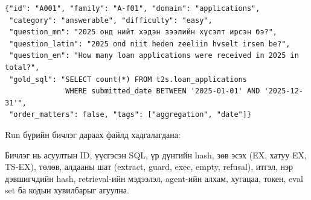 \begin{lstlisting}[basicstyle=\ttfamily\scriptsize, caption={Бичлэгийн жишээ (dev, A001; уншихад хялбар болгож мөр таслав, зарим талбарыг орхив)}, breaklines=true, showstringspaces=false, language={}]
{"id": "A001", "family": "A-f01", "domain": "applications",
 "category": "answerable", "difficulty": "easy",
 "question_mn": "2025 онд нийт хэдэн зээлийн хүсэлт ирсэн бэ?",
 "question_latin": "2025 ond niit heden zeeliin hvselt irsen be?",
 "question_en": "How many loan applications were received in 2025 in total?",
 "gold_sql": "SELECT count(*) FROM t2s.loan_applications
              WHERE submitted_date BETWEEN '2025-01-01' AND '2025-12-31'",
 "order_matters": false, "tags": ["aggregation", "date"]}
\end{lstlisting}

Run бүрийн бичлэг дараах файлд хадгалагдана:
\begin{center}
\end{center}
Бичлэг нь асуултын ID, үүсгэсэн SQL, үр дүнгийн hash, зөв эсэх (EX, хатуу EX, TS-EX), төлөв, алдааны шат (extract,
guard, exec, empty, refusal), итгэл, нэр дэвшигчдийн hash, retrieval-ийн мэдээлэл, agent-ийн алхам, хугацаа, токен,
eval set ба кодын хувилбарыг агуулна.
